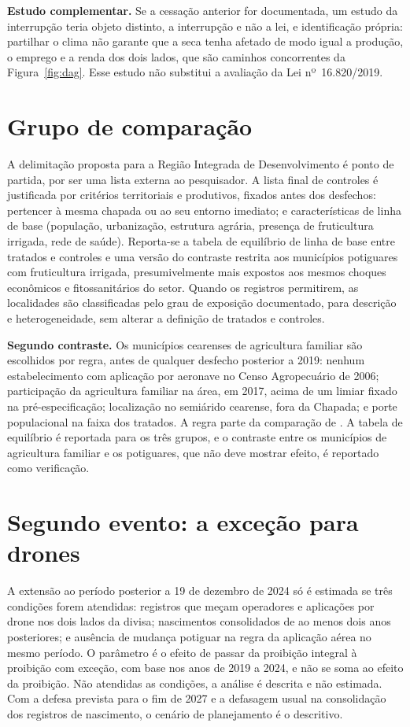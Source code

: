 \textbf{Estudo complementar.} Se a cessação anterior for documentada, um estudo
da interrupção teria objeto distinto, a interrupção e não a lei, e
identificação própria: partilhar o clima não garante que a seca tenha afetado
de modo igual a produção, o emprego e a renda dos dois lados, que são caminhos
concorrentes da Figura~\ref{fig:dag}. Esse estudo não substitui a avaliação da
Lei nº~16.820/2019.

\section{Grupo de comparação}

A delimitação proposta para a Região Integrada de Desenvolvimento é ponto de
partida, por ser uma lista externa ao pesquisador. A lista final de controles é
justificada por critérios territoriais e produtivos, fixados antes dos
desfechos: pertencer à mesma chapada ou ao seu entorno imediato; e
características de linha de base (população, urbanização, estrutura agrária,
presença de fruticultura irrigada, rede de saúde). Reporta-se a tabela de
equilíbrio de linha de base entre tratados e controles e uma versão do
contraste restrita aos municípios potiguares com fruticultura irrigada, presumivelmente mais expostos aos mesmos choques econômicos e fitossanitários do setor. Quando os
registros permitirem, as localidades são classificadas pelo grau de exposição
documentado, para descrição e heterogeneidade, sem alterar a definição de
tratados e controles.

\textbf{Segundo contraste.} Os municípios cearenses de agricultura familiar
são escolhidos por regra, antes de qualquer desfecho posterior a 2019: nenhum
estabelecimento com aplicação por aeronave no Censo Agropecuário de 2006;
participação da agricultura familiar na área, em 2017, acima de um limiar
fixado na pré-especificação; localização no semiárido cearense, fora da
Chapada; e porte populacional na faixa dos tratados. A regra parte da
comparação de . A tabela de equilíbrio é
reportada para os três grupos, e o contraste entre os municípios de
agricultura familiar e os potiguares, que não deve mostrar efeito, é
reportado como verificação.

\section{Segundo evento: a exceção para drones}

A extensão ao período posterior a 19 de dezembro de 2024 só é estimada se três
condições forem atendidas: registros que meçam operadores e aplicações por
drone nos dois lados da divisa; nascimentos consolidados de ao menos dois anos
posteriores; e ausência de mudança potiguar na regra da aplicação aérea no
mesmo período. O parâmetro é o efeito de passar da proibição integral à
proibição com exceção, com base nos anos de 2019 a 2024, e não se soma ao
efeito da proibição. Não atendidas as condições, a análise é descrita e não
estimada. Com a defesa prevista para o fim de 2027 e a defasagem usual na
consolidação dos registros de nascimento, o cenário de planejamento é o
descritivo.

